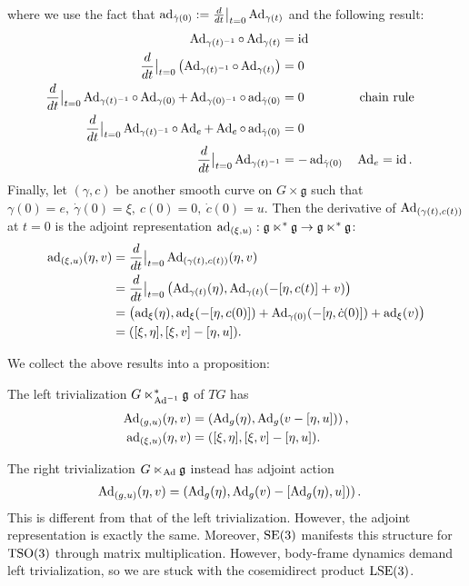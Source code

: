 \documentclass[12pt,class=article,crop=false]{standalone}
\begin{document}
where we use the fact that $ \operatorname{ad}_{ \dot{ \gamma}(0)} := \frac{d}{dt}\big|_{t= 0} \operatorname{Ad}_{ \gamma(t)}$ and the following result: 
\begin{align*}
\operatorname{Ad}_{ \gamma(t)^{-1}} \circ  \operatorname{Ad}_{ \gamma(t)} &= \operatorname{id}  \\
\frac{d}{dt}\big|_{t= 0} \left( \operatorname{Ad}_{ \gamma(t)^{-1}} \circ  \operatorname{Ad}_{ \gamma(t)} \right) &= 0 \\
\frac{d}{dt}\big|_{t= 0} \operatorname{Ad}_{ \gamma(t)^{-1}} \circ  \operatorname{Ad}_{ \gamma(0)} + \operatorname{Ad}_{ \gamma(0)^{-1}} \circ \operatorname{ad}_{ \dot{ \gamma}(0)} &= 0 && \text{ chain rule}\\
\frac{d}{dt}\big|_{t= 0} \operatorname{Ad}_{ \gamma(t)^{-1}} \circ \operatorname{Ad}_{ e} + \operatorname{Ad}_{ e} \circ \operatorname{ad}_{\dot{ \gamma}(0)} &= 0 \\
\frac{d}{dt}\big|_{t= 0} \operatorname{Ad}_{ \gamma(t)^{-1}} &= - \operatorname{ad}_{ \dot{ \gamma}(0)}  && \operatorname{Ad}_{ e} = \operatorname{id}  . 
\end{align*}
Finally, let $ (\gamma, c)$ be another smooth curve on $ G \times  \mathfrak{g}$ such that $ \gamma(0) = e,\ \dot{ \gamma}(0) = \xi,\ c(0) =0,\ \dot{c}(0) = u$. Then the derivative of $ \operatorname{Ad}_{ ( \gamma(t), c(t))}$ at $ t=0$ is the adjoint representation $ \operatorname{ad}_{ (\xi, u)}: \mathfrak{g} \ltimes^*  \mathfrak{g} \to \mathfrak{g} \ltimes^*  \mathfrak{g} $:
\begin{align*}
	\operatorname{ad}_{ (\xi,u)}(\eta, v) &= \frac{d}{dt}\big|_{t= 0} \operatorname{Ad}_{ ( \gamma(t), c(t))}( \eta,v ) \\
				&= \frac{d}{dt}\big|_{t= 0} \left( \operatorname{Ad}_{ \gamma(t)}( \eta), \operatorname{Ad}_{ \gamma(t)}( -[\eta, c(t)] + v) \right)    \\
				&= \left( \operatorname{ad}_{ \xi}(\eta), \operatorname{ad}_{ \xi} (-[\eta,c(0)]) + \operatorname{Ad}_{ \gamma(0)}( - [\eta, \dot{c}(0)] ) + \operatorname{ad}_{ \xi}(v) \right)   \\
				&= ([ \xi, \eta], [\xi, v] - [\eta, u]) .
\end{align*}

We collect the above results into a proposition:
\begin{prop}
The left trivialization $ G \ltimes_{\operatorname{Ad}^{-1}}^* \mathfrak{g} $ of $ TG$ has
 \begin{align*}
	\operatorname{Ad}_{ (g,u)}(\eta, v ) &= \left( \operatorname{Ad}_{ g}( \eta), \operatorname{Ad}_{ g}(v-[ \eta, u]) \right),\\
	\operatorname{ad}_{ (\xi,u)}(\eta, v) &=  ([ \xi, \eta], [\xi, v] - [\eta, u]). 
\end{align*}
\end{prop}
\begin{remark}
The right trivialization $ G \ltimes_{\operatorname{Ad}} \mathfrak{g} $ instead has adjoint action
\begin{align*}
	\operatorname{Ad}_{ (g,u)}(\eta, v ) &= \left( \operatorname{Ad}_{ g}( \eta), \operatorname{Ad}_{ g}(v)-[ \operatorname{Ad}_{ g}( \eta), u]) \right).
\end{align*}
This is different from that of the left trivialization. However, the adjoint representation is exactly the same. Moreover, $ \operatorname{SE}(3)$ manifests this structure for $ \operatorname{TSO}(3)$ through matrix multiplication. However, body-frame dynamics demand left trivialization, so we are stuck with the cosemidirect product $ \operatorname{LSE}(3)$.
\end{remark}
\end{document}
